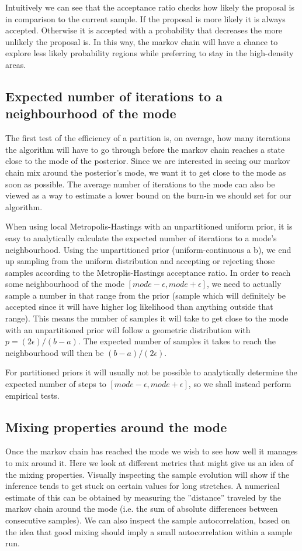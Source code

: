 Intuitively we can see that the acceptance ratio checks how likely the proposal is in comparison to the current sample. If the proposal is more likely it is always accepted. Otherwise it is accepted with a probability that decreases the more unlikely the proposal is. In this way, the markov chain will have a chance to explore less likely probability regions while preferring to stay in the high-density areas.

\subsection{Expected number of iterations to a neighbourhood of the mode}
\label{section:sampsToMode}
The first test of the efficiency of a partition is, on average, how many iterations the algorithm will have to go through before the markov chain reaches a state close to the mode of the posterior. Since we are interested in seeing our markov chain mix around the posterior's mode, we want it to get close to the mode as soon as possible. The average number of iterations to the mode can also be viewed as a way to estimate a lower bound on the burn-in we should set for our algorithm.

When using local Metropolis-Hastings with an unpartitioned uniform prior, it is easy to analytically calculate the expected number of iterations to a mode's neighbourhood. Using the unpartitioned prior (uniform-continuous a b), we end up sampling from the uniform distribution and accepting or rejecting those samples according to the Metroplis-Hastings acceptance ratio. In order to reach some neighbourhood of the mode $[mode - \epsilon, mode + \epsilon]$, we need to actually sample a number in that range from the prior (sample which will definitely be accepted since it will have higher log likelihood than anything outside that range). This means the number of samples it will take to get close to the mode with an unpartitioned prior will follow a geometric distribution with $p = (2\epsilon)/(b-a)$. The expected number of samples it takes to reach the neighbourhood will then be $(b-a)/(2\epsilon)$.

For partitioned priors it will usually not be possible to analytically determine the expected number of steps to $[mode - \epsilon, mode + \epsilon]$, so we shall instead perform empirical tests.

\subsection{Mixing properties around the mode}
Once the markov chain has reached the mode we wish to see how well it manages to mix around it. Here we look at different metrics that might give us an idea of the mixing properties. Visually inspecting the sample evolution will show if the inference tends to get stuck on certain values for long stretches. A numerical estimate of this can be obtained by measuring the ''distance'' traveled by the markov chain around the mode (i.e. the sum of absolute differences between consecutive samples). We can also inspect the sample autocorrelation, based on the idea that good mixing should imply a small autocorrelation within a sample run.

